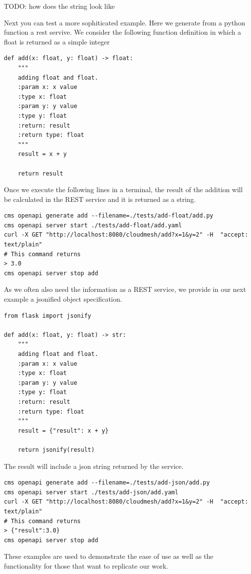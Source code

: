 TODO: how does the string look like

Next you can test a more sophiticated example. Here we generate from a
python function a rest servive. We consider the following function
definition in which a float is returned as a simple integer

\begin{verbatim}
def add(x: float, y: float) -> float:
    """
    adding float and float.
    :param x: x value
    :type x: float
    :param y: y value
    :type y: float
    :return: result
    :return type: float
    """
    result = x + y

    return result
\end{verbatim}

Once we execute the following lines in a terminal, the result of the
addition will be calculated in the REST service and it is returned as a
string.

\begin{verbatim}
cms openapi generate add --filename=./tests/add-float/add.py
cms openapi server start ./tests/add-float/add.yaml 
curl -X GET "http://localhost:8080/cloudmesh/add?x=1&y=2" -H  "accept: text/plain"
# This command returns
> 3.0
cms openapi server stop add
\end{verbatim}

As we often also need the information as a REST service, we provide in
our next example a jsonified object specification.

\begin{verbatim}
from flask import jsonify

def add(x: float, y: float) -> str:
    """
    adding float and float.
    :param x: x value
    :type x: float
    :param y: y value
    :type y: float
    :return: result
    :return type: float
    """
    result = {"result": x + y}

    return jsonify(result)
\end{verbatim}

The result will include a json string returned by the service.

\begin{verbatim}
cms openapi generate add --filename=./tests/add-json/add.py
cms openapi server start ./tests/add-json/add.yaml 
curl -X GET "http://localhost:8080/cloudmesh/add?x=1&y=2" -H  "accept: text/plain"
# This command returns
> {"result":3.0}
cms openapi server stop add
\end{verbatim}

These examples are used to demonstrate the ease of use as well as the
functionality for those that want to replicate our work.


